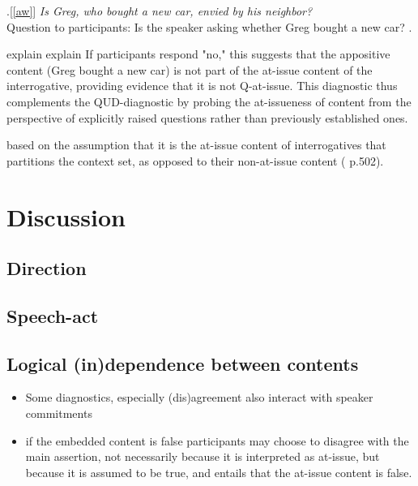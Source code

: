 \documentclass[times,linguex,xcolor]{glossa}
\begin{document}
    \ex.[\ref{aw}]%
        \emph{Is Greg, who bought a new car, envied by his neighbor?}\smallskip
    \\ Question to participants: Is the speaker asking whether Greg bought a new car?
    \z.

    explain explain
    If participants respond "no," this suggests that the appositive content (Greg bought a new car) is not part of the at-issue content of the interrogative, providing evidence that it is not Q-at-issue. This diagnostic thus complements the QUD-diagnostic by probing the at-issueness of content from the perspective of explicitly raised questions rather than previously established ones.

    based on the assumption that it is the at-issue content of interrogatives that partitions the context set, as opposed to their non-at-issue content (\citealt{tonhauser_how_2018} p.502).


 
  


\section{Discussion}
  \subsection{Direction}
  \subsection{Speech-act}
  \subsection{Logical (in)dependence between contents}
    \begin{itemize}
      \item Some diagnostics, especially (dis)agreement also interact with speaker commitments

      \item if the embedded content is false participants may choose to disagree with the main assertion, not necessarily because it is interpreted as at-issue, but because it is assumed to be true, and entails that the at-issue content is false.

    \end{itemize}
\end{document}
